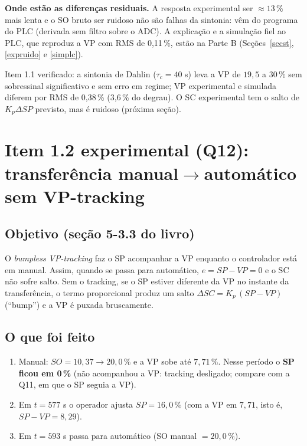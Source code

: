 \begin{just}\textbf{Onde estão as diferenças residuais.} A resposta experimental ser $\approx13\,\%$ mais lenta e o SO bruto ser ruidoso não são falhas da sintonia: vêm do programa do PLC (derivada sem filtro sobre o ADC). A explicação e a simulação fiel ao PLC, que reproduz a VP com RMS de 0,11\,\%, estão na Parte B (Seções~\ref{secst}, \ref{expruido} e \ref{simplc}).\end{just}
\begin{res}Item 1.1 verificado: a sintonia de Dahlin ($\tau_c=40$ s) leva a VP de $19{,}5$ a $30\,\%$ sem sobressinal significativo e sem erro em regime; VP experimental e simulada diferem por RMS de 0,38\,\% (3,6\,\% do degrau). O SC experimental tem o salto de $K_p\Delta SP$ previsto, mas é ruidoso (próxima seção).\end{res}

\section{Item 1.2 experimental (Q12): transferência manual$\to$automático sem VP-tracking}\label{expq12}
\subsection{Objetivo (seção 5-3.3 do livro)}
O \emph{bumpless VP-tracking} faz o SP acompanhar a VP enquanto o controlador está em manual. Assim, quando se passa para automático, $e=SP-VP=0$ e o SC não sofre salto. Sem o tracking, se o SP estiver diferente da VP no instante da transferência, o termo proporcional produz um salto $\Delta SC=K_p\,(SP-VP)$ (``bump'') e a VP é puxada bruscamente.
\subsection{O que foi feito}
\begin{enumerate}
\item Manual: $SO=10{,}37\to20{,}0\,\%$ e a VP sobe até $7{,}71\,\%$. Nesse período o \textbf{SP ficou em 0\,\%} (não acompanhou a VP: tracking desligado; compare com a Q11, em que o SP seguia a VP).
\item Em $t=577$ s o operador ajusta $SP=16{,}0\,\%$ (com a VP em $7{,}71$, isto é, $SP-VP=8{,}29$).
\item Em $t=593$ s passa para automático (SO manual $=20{,}0\,\%$).
\end{enumerate}
